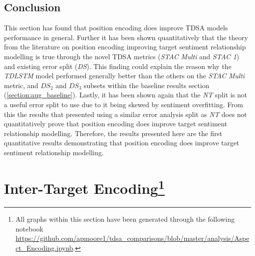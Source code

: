 \subsection{Conclusion}
This section has found that position encoding does improve TDSA models performance in general. Further it has been shown quantitatively that the theory from the literature on position encoding improving target sentiment relationship modelling \citep{li-etal-2018-hierarchical, he-etal-2018-effective} is true through the novel TDSA metrics (\textit{STAC Multi} and \textit{STAC 1}) and existing error split (\textit{DS}). This finding could explain the reason why the \textit{TDLSTM} model performed generally better than the others on the \textit{STAC Multi} metric, and $DS_2$ and $DS_3$ subsets within the baseline results section (\ref{section:aug_baseline}). Lastly, it has been shown again that the \textit{NT} split is not a useful error split to use due to it being skewed by sentiment overfitting. From this the results that \citet{he-etal-2018-effective} presented using a similar error analysis split as \textit{NT} does not quantitatively prove that position encoding does improve target sentiment relationship modelling. Therefore, the results presented here are the first quantitative results demonstrating that position encoding does improve target sentiment relationship modelling.

\section[Inter-Target Encoding]{Inter-Target Encoding\footnote{All graphs within this section have been generated through the following notebook \url{https://github.com/apmoore1/tdsa_comparisons/blob/master/analysis/Aspect_Encoding.ipynb}.}}
\label{section:aug_inter_target_encoding}

